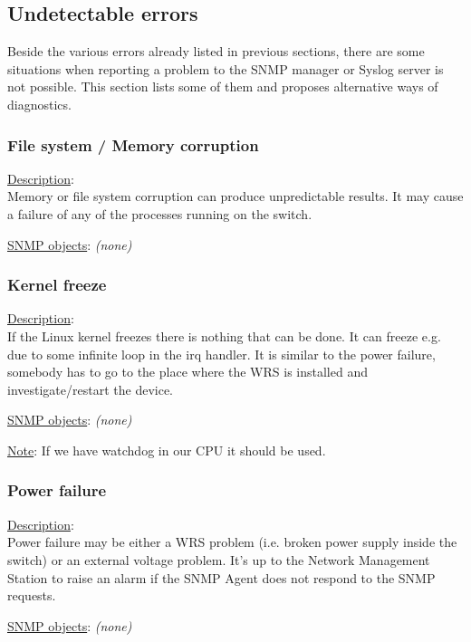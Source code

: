 \newpage
\subsection{Undetectable errors}

Beside the various errors already listed in previous sections, there are some
situations when reporting a problem to the SNMP manager or Syslog server is not
possible. This section lists some of them and proposes alternative ways of
diagnostics.

\subsubsection{\bf File system / Memory corruption}
		\label{fail:other:memory}
		\begin{pck_descr}
			\item [] \underline{Description}:\\
				Memory or file system corruption can produce unpredictable results. It
				may cause a failure of any of the processes running on the switch.
			\item [] \underline{SNMP objects}: \emph{(none)}
		\end{pck_descr}

\subsubsection{\bf Kernel freeze}
		\begin{pck_descr}
			\item [] \underline{Description}:\\
				If the Linux kernel freezes there is nothing that can be done. It can
				freeze e.g. due to some infinite loop in the irq handler. It is similar
				to the power failure, somebody has to go to the place where the WRS is
				installed and investigate/restart the device.
			\item [] \underline{SNMP objects}: \emph{(none)}
			\item [] \underline{Note}:
				If we have watchdog in our CPU it should be used.
		\end{pck_descr}

\subsubsection{\bf Power failure}
		\begin{pck_descr}
			\item [] \underline{Description}:\\
				Power failure may be either a WRS problem (i.e. broken power supply
				inside the switch) or an external voltage problem. It's up to the
				Network Management Station to raise an alarm if the SNMP Agent does
				not respond to the SNMP requests.
			\item [] \underline{SNMP objects}: \emph{(none)}
		\end{pck_descr}

